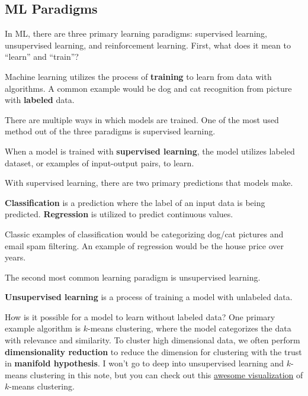 \documentclass[../../../main.tex]{subfiles}
\begin{document}
\subsection{ML Paradigms}

In ML, there are three primary learning paradigms: supervised
learning, unsupervised learning, and reinforcement learning.
First, what does it mean to ``learn'' and ``train''?

\begin{definition}{}{}
Machine learning utilizes the process of \textbf{training} to
learn from data with algorithms. A common example would be
dog and cat recognition from picture with \textbf{labeled} data.
\end{definition}

There are multiple ways in which models are trained. One of the
most used method out of the three paradigms is supervised learning.

\begin{definition}{}{}
When a model is trained with \textbf{supervised learning},
the model utilizes labeled dataset, or examples of input-output
pairs, to learn.
\end{definition}

With supervised learning, there are two primary predictions that
models make.

\begin{definition}{}{}
\textbf{Classification} is a prediction where the label of an
input data is being predicted. \textbf{Regression} is utilized
to predict continuous values.
\end{definition}

Classic examples of classification would be categorizing dog/cat
pictures and email spam filtering. An example of regression would
be the house price over years.

The second most common learning paradigm is unsupervised learning.

\begin{definition}{}{}
\textbf{Unsupervised learning} is a process of training a model
with unlabeled data.
\end{definition}

How is it possible for a model to learn without labeled data?
One primary example algorithm is $k$-means clustering,
where the model categorizes the data with relevance and similarity.
To cluster high dimensional data, we often perform
\textbf{dimensionality reduction} to reduce the dimension for
clustering with the trust in \textbf{manifold hypothesis}.
I won't go to deep into unsupervised learning and $k$-means clustering
in this note, but you can check out this
\href{https://www.naftaliharris.com/blog/visualizing-k-means-clustering/}
{awesome visualization} of $k$-means clustering.
\end{document}
